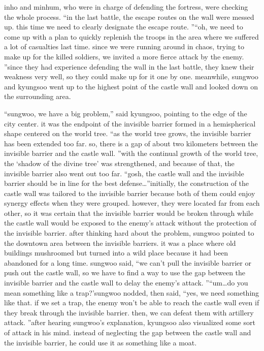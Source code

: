 inho and minhum, who were in charge of defending the fortress, were checking the whole process.
“in the last battle, the escape routes on the wall were messed up.
 this time we need to clearly designate the escape route.
”“oh, we need to come up with a plan to quickly replenish the troops in the area where we suffered a lot of casualties last time.
 since we were running around in chaos, trying to make up for the killed soldiers, we invited a more fierce attack by the enemy.
”since they had experience defending the wall in the last battle, they knew their weakness very well, so they could make up for it one by one.
meanwhile, sungwoo and kyungsoo went up to the highest point of the castle wall and looked down on the surrounding area.

“sungwoo, we have a big problem,” said kyungsoo, pointing to the edge of the city center.
it was the endpoint of the invisible barrier formed in a hemispherical shape centered on the world tree.
“as the world tree grows, the invisible barrier has been extended too far.
 so, there is a gap of about two kilometers between the invisible barrier and the castle wall.
”with the continual growth of the world tree, the ‘shadow of the divine tree’ was strengthened, and because of that, the invisible barrier also went out too far.
“gosh, the castle wall and the invisible barrier should be in line for the best defense…”initially, the construction of the castle wall was tailored to the invisible barrier because both of them could enjoy synergy effects when they were grouped.
however, they were located far from each other, so it was certain that the invisible barrier would be broken through while the castle wall would be exposed to the enemy’s attack without the protection of the invisible barrier.
after thinking hard about the problem, sungwoo pointed to the downtown area between the invisible barriers.
 it was a place where old buildings mushroomed but turned into a wild place because it had been abandoned for a long time.
sungwoo said, “we can’t pull the invisible barrier or push out the castle wall, so we have to find a way to use the gap between the invisible barrier and the castle wall to delay the enemy’s attack.
”“um…do you mean something like a trap?’sungwoo nodded, then said, “yes, we need something like that.
 if we set a trap, the enemy won’t be able to reach the castle wall even if they break through the invisible barrier.
 then, we can defeat them with artillery attack.
”after hearing sungwoo’s explanation, kyungsoo also visualized some sort of attack in his mind.
instead of neglecting the gap between the castle wall and the invisible barrier, he could use it as something like a moat.
